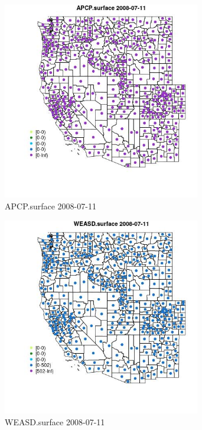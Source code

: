 \begin{figure} 
\centering  
\includegraphics[width=0.77\textwidth]{Code_Outputs/df_report_ML_predictors_CountyCentroid_Locations_Dates_2008-01-01to2018-12-31_MapObsAPCPsurface2008-07-11.jpg} 
\caption{\label{fig:df_report_ML_predictors_CountyCentroid_Locations_Dates_2008-01-01to2018-12-31MapObsAPCPsurface2008-07-11}APCP.surface 2008-07-11} 
\end{figure} 
 

\begin{figure} 
\centering  
\includegraphics[width=0.77\textwidth]{Code_Outputs/df_report_ML_predictors_CountyCentroid_Locations_Dates_2008-01-01to2018-12-31_MapObsWEASDsurface2008-07-11.jpg} 
\caption{\label{fig:df_report_ML_predictors_CountyCentroid_Locations_Dates_2008-01-01to2018-12-31MapObsWEASDsurface2008-07-11}WEASD.surface 2008-07-11} 
\end{figure} 
 

